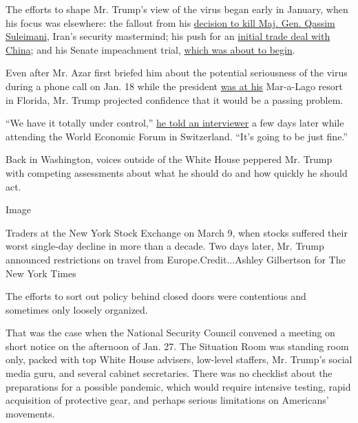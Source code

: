 The efforts to shape Mr. Trump's view of the virus began early in
January, when his focus was elsewhere: the fallout from his
\href{https://www.nytimes3xbfgragh.onion/2020/01/03/world/middleeast/iranian-general-qassem-soleimani-killed.html}{decision
to kill Maj. Gen. Qassim Suleimani}, Iran's security mastermind; his
push for an
\href{https://www.nytimes3xbfgragh.onion/2019/10/11/business/economy/us-china-trade-deal.html}{initial
trade deal with China}; and his Senate impeachment trial,
\href{https://www.nytimes3xbfgragh.onion/2020/01/21/us/politics/trump.html}{which
was about to begin}.

Even after Mr. Azar first briefed him about the potential seriousness of
the virus during a phone call on Jan. 18 while the president
\href{https://www.nytimes3xbfgragh.onion/interactive/2017/04/05/us/politics/tracking-trumps-visits-to-his-branded-properties.html}{was
at his} Mar-a-Lago resort in Florida, Mr. Trump projected confidence
that it would be a passing problem.

``We have it totally under control,''
\href{https://www.cnbc.com/2020/01/22/cnbc-transcript-president-donald-trump-sits-down-with-cnbcs-joe-kernen-at-the-world-economic-forum-in-davos-switzerland.html}{he
told an interviewer} a few days later while attending the World Economic
Forum in Switzerland. ``It's going to be just fine.''

Back in Washington, voices outside of the White House peppered Mr. Trump
with competing assessments about what he should do and how quickly he
should act.

Image

Traders at the New York Stock Exchange on March 9, when stocks suffered
their worst single-day decline in more than a decade. Two days later,
Mr. Trump announced restrictions on travel from Europe.Credit...Ashley
Gilbertson for The New York Times

The efforts to sort out policy behind closed doors were contentious and
sometimes only loosely organized.

That was the case when the National Security Council convened a meeting
on short notice on the afternoon of Jan. 27. The Situation Room was
standing room only, packed with top White House advisers, low-level
staffers, Mr. Trump's social media guru, and several cabinet
secretaries. There was no checklist about the preparations for a
possible pandemic, which would require intensive testing, rapid
acquisition of protective gear, and perhaps serious limitations on
Americans' movements.

